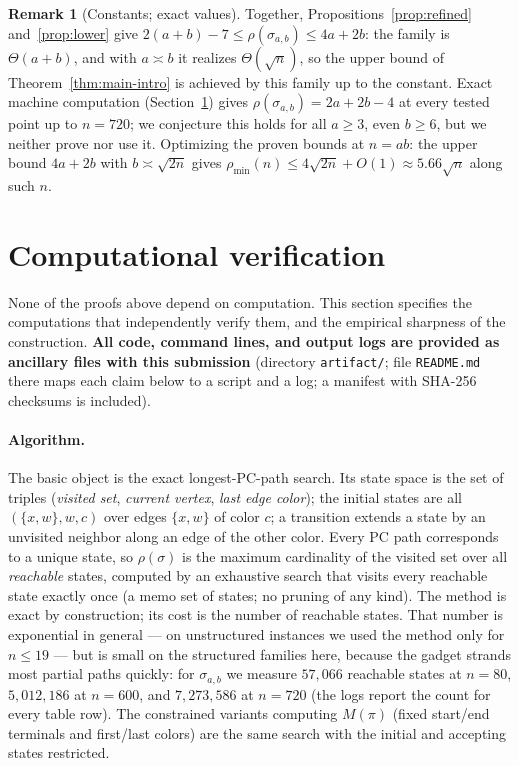 \documentclass[11pt]{article}
\theoremstyle{definition}
\newtheorem{remark}[theorem]{Remark}
\newcommand{\pmin}{\rho_{\min}}
\begin{document}
\begin{remark}[Constants; exact values]\label{rem:constants}
Together, Propositions~\ref{prop:refined} and~\ref{prop:lower} give
$2(a+b) - 7 \le \rho(\sigma_{a,b}) \le 4a + 2b$: the family is $\Theta(a + b)$, and
with $a \asymp b$ it realizes $\Theta(\sqrt n)$, so the upper bound of
Theorem~\ref{thm:main-intro} is achieved by this family up to the constant. Exact
machine computation (Section~\ref{sec:comp}) gives $\rho(\sigma_{a,b}) = 2a + 2b -
4$ at every tested point up to $n = 720$; we conjecture this holds for all $a \ge
3$, even $b \ge 6$, but we neither prove nor use it. Optimizing the proven bounds
at $n = ab$: the upper bound $4a + 2b$ with $b \asymp \sqrt{2n}$ gives
$\pmin(n) \le 4\sqrt{2n} + O(1) \approx 5.66\sqrt n$ along such $n$.
\end{remark}

\section{Computational verification}\label{sec:comp}

None of the proofs above depend on computation. This section specifies the
computations that independently verify them, and the empirical sharpness of the
construction. \textbf{All code, command lines, and output logs are provided as
ancillary files with this submission} (directory \texttt{artifact/}; file
\texttt{README.md} there maps each claim below to a script and a log; a manifest
with SHA-256 checksums is included).

\paragraph{Algorithm.} The basic object is the exact longest-PC-path search. Its
state space is the set of triples (\emph{visited set}, \emph{current vertex},
\emph{last edge color}); the initial states are all $(\{x, w\}, w, c)$ over edges
$\{x, w\}$ of color $c$; a transition extends a state by an unvisited neighbor along
an edge of the other color. Every PC path corresponds to a unique state, so
$\rho(\sigma)$ is the maximum cardinality of the visited set over all
\emph{reachable} states, computed by an exhaustive search that visits every
reachable state exactly once (a memo set of states; no pruning of any kind). The
method is exact by construction; its cost is the number of reachable states. That
number is exponential in general --- on unstructured instances we used the method
only for $n \le 19$ --- but is small on the structured families here, because the
gadget strands most partial paths quickly: for $\sigma_{a,b}$ we measure
$57{,}066$ reachable states at $n = 80$, $5{,}012{,}186$ at $n = 600$, and
$7{,}273{,}586$ at $n = 720$ (the logs report the count for every table row). The constrained variants computing $M(\pi)$
(fixed start/end terminals and first/last colors) are the same search with the
initial and accepting states restricted.
\end{document}
